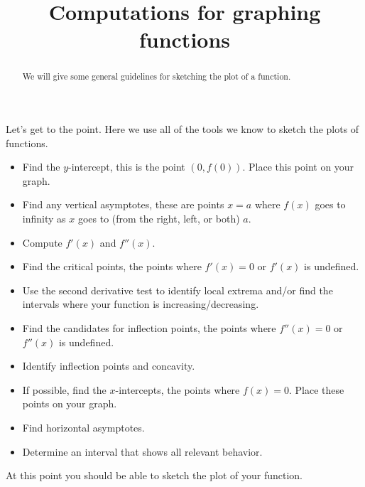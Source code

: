 \documentclass{ximera}
\title[Dig-In:]{Computations for graphing functions}
\begin{document}
\begin{abstract}
  We will give some general guidelines for sketching the plot of a
  function.
\end{abstract}
\maketitle

Let's get to the point. Here we use all of the tools we know to sketch
the plots of functions.


\begin{itemize}
\item Find the $y$-intercept, this is the point $(0,f(0))$. Place this
  point on your graph.
\item Find any vertical asymptotes, these are points $x=a$ where
  $f(x)$ goes to infinity as $x$ goes to (from the right, left, or
  both) $a$.
\item Compute $f'(x)$ and $f''(x)$.
\item Find the critical points, the points where $f'(x) = 0$ or
  $f'(x)$ is undefined.
\item Use the second derivative test to identify local extrema and/or
  find the intervals where your function is increasing/decreasing.
\item Find the candidates for inflection points, the points where
  $f''(x) = 0$ or $f''(x)$ is undefined.
\item Identify inflection points and concavity.
\item If possible, find the $x$-intercepts, the points where $f(x) =
  0$. Place these points on your graph.
\item Find horizontal asymptotes.
\item Determine an interval that shows all relevant behavior.
\end{itemize}
At this point you should be able to sketch the plot of your function.
\end{document}
